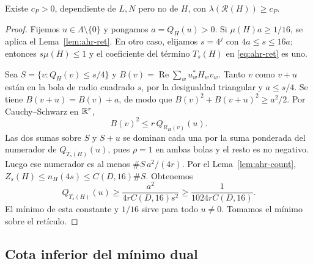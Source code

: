 \begin{proposicion}
\label{prop:ahr-low}
Existe $c_P>0$, dependiente de $L,N$ pero no de $H$, con $\lambda(\mathcal R(H))\ge c_P$.
\end{proposicion}
\begin{proof}
Fijemos $u\in\Lambda\setminus\{0\}$ y pongamos $a=Q_H(u)>0$. Si $\mu(H)a\ge1/16$, se aplica el Lema~\ref{lem:ahr-ret}. En otro caso, elijamos $s=4^j$ con $4a\le s\le16a$; entonces $s\mu(H)\le1$ y el coeficiente del término $T_s(H)$ en \eqref{eq:ahr-ret} es uno.

Sea $S=\{v:Q_H(v)\le s/4\}$ y $B(v)=\operatorname{Re}\sum_w u_w^*H_wv_w$. Tanto $v$ como $v+u$ están en la bola de radio cuadrado $s$, por la desigualdad triangular y $a\le s/4$. Se tiene $B(v+u)=B(v)+a$, de modo que $B(v)^2+B(v+u)^2\ge a^2/2$. Por Cauchy--Schwarz en $\mathbb{R}^r$,
\[
 B(v)^2\le r\,Q_{R_H(v)}(u).
\]
Las dos sumas sobre $S$ y $S+u$ se dominan cada una por la suma ponderada del numerador de $Q_{T_s(H)}(u)$, pues $\rho=1$ en ambas bolas y el resto es no negativo. Luego ese numerador es al menos $\#S\,a^2/(4r)$. Por el Lema~\ref{lem:ahr-count}, $Z_s(H)\le n_H(4s)\le C(D,16)\#S$. Obtenemos
\begin{equation}
 Q_{T_s(H)}(u)\ge\frac{a^2}{4r C(D,16)s^2}
 \ge\frac1{1024r C(D,16)}.
 \label{eq:ahr-primal}
\end{equation}
El mínimo de esta constante y $1/16$ sirve para todo $u\ne0$. Tomamos el mínimo sobre el retículo.
\end{proof}

\subsection{Cota inferior del mínimo dual}

